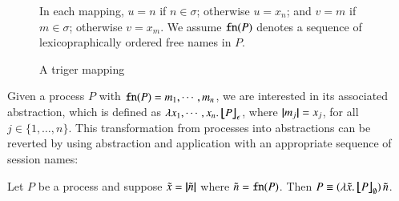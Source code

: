 \begin{definition}
\begin{figure}[t]
In each mapping, $u = n$ if $n\in \sigma$; otherwise $u = x_n$; and  
$v = m$ if $m\in \sigma$; otherwise $v = x_m$. 
We assume $\mathtt{fn}(P)$ denotes a sequence of lexicopraphically ordered 
free names in $P$. 
\caption{\label{f:auxmap} A triger mapping}
\end{figure}
\end{definition}

Given a process $P$ with $\mathtt{fn}(P) = m_1, \cdots, m_n$, we are interested in its associated abstraction, which is defined as
$\lambda x_1, \cdots, x_n.\,\big\lfloor\!\!\big\lfloor P\big\rfloor\!\!\big\rfloor^{}_\epsilon$, where $|\!|m_j|\!| = x_j$, for all $j \in \{1, \ldots, n\}$.
This transformation from processes into abstractions can be reverted by
using abstraction and application with an appropriate sequence of session names:
%
\begin{proposition}\rm
	Let $P$ be a \HOp process and 
	suppose $\tilde{x} = |\!|\tilde{n}|\!|$ where 
$\tilde{n} = \mathtt{fn}(P)$.
	Then $P \equiv (\lambda \tilde{x}.\,\big\lfloor\!\!\big\lfloor P\big\rfloor\!\!\big\rfloor^{}_\emptyset)\, {\tilde{n}}$.
\end{proposition}



